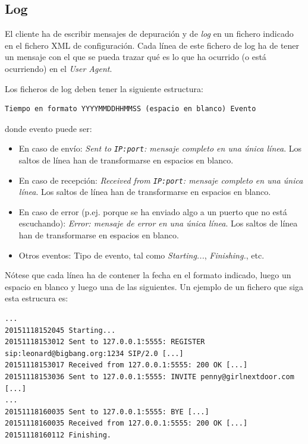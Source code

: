 \documentclass[a4paper,11pt]{article}
\begin{document}
\subsection{Log}


El cliente ha de escribir mensajes de depuración y de \emph{log} en un fichero indicado en el fichero XML de configuración. Cada línea de este fichero de log ha de tener un mensaje con el que se pueda trazar qué es lo que ha ocurrido (o está ocurriendo) en el \emph{User Agent}.

Los ficheros de log deben tener la siguiente estructura:


\begin{footnotesize}
\begin{verbatim}
Tiempo en formato YYYYMMDDHHMMSS (espacio en blanco) Evento
\end{verbatim}
\end{footnotesize}

donde evento puede ser:

\begin{itemize}
  \item En caso de envío: \emph{Sent to \texttt{IP:port}: mensaje completo en una única línea}. Los saltos de línea han de transformarse en espacios en blanco.
  \item En caso de recepción: \emph {Received from \texttt{IP:port}: mensaje completo en una única línea}. Los saltos de línea han de transformarse en espacios en blanco.
  \item En caso de error (p.ej. porque se ha enviado algo a un puerto que no está escuchando): \emph{Error: mensaje de error en una única línea}. Los saltos de línea han de transformarse en espacios en blanco.
  \item Otros eventos: Tipo de evento, tal como \emph{Starting...}, \emph{Finishing.}, etc.
\end{itemize}


Nótese que cada línea ha de contener la fecha en el formato indicado, luego
un espacio en blanco y luego una de las siguientes. Un ejemplo de un fichero que siga esta estrucura es:

\begin{footnotesize}
\begin{verbatim}
...
20151118152045 Starting...
20151118153012 Sent to 127.0.0.1:5555: REGISTER sip:leonard@bigbang.org:1234 SIP/2.0 [...]
20151118153017 Received from 127.0.0.1:5555: 200 OK [...]
20151118153036 Sent to 127.0.0.1:5555: INVITE penny@girlnextdoor.com [...]
...
20151118160035 Sent to 127.0.0.1:5555: BYE [...]
20151118160035 Received from 127.0.0.1:5555: 200 OK [...]
20151118160112 Finishing.
\end{verbatim}
\end{footnotesize}
\end{document}
